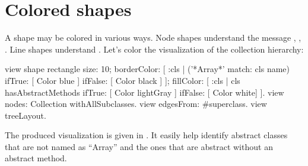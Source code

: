 \documentclass[a4paper,10pt,twoside]{book}
\begin{document}
%


%
%

\section{Colored shapes}

A shape may be colored in various ways. Node shapes understand the message , , . Line shapes understand . Let's color the visualization of the collection hierarchy:

\begin{code}{}
view shape rectangle
	size: 10;
	borderColor: [ :cls | ('*Array*' match: cls name) 
										ifTrue: [ Color blue ] 
										ifFalse: [ Color black ] ];
	fillColor: [ :cls | cls hasAbstractMethods ifTrue: [ Color lightGray ] ifFalse: [ Color white] ].
view nodes: Collection withAllSubclasses.
view edgesFrom: #superclass.
view treeLayout.
\end{code}

The produced visualization is given in . It easily help identify abstract classes that are not named as ``Array'' and the ones that are abstract without an abstract method.
\end{document}
